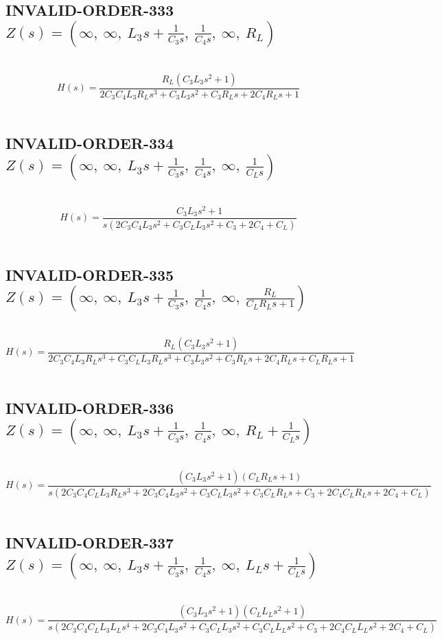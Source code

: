 \documentclass{article}
\begin{document}
\subsection{INVALID-ORDER-333 $Z(s) = \left( \infty, \  \infty, \  L_{3} s + \frac{1}{C_{3} s}, \  \frac{1}{C_{4} s}, \  \infty, \  R_{L}\right)$ } \ 
\textbf{\[H(s) = \frac{R_{L} \left(C_{3} L_{3} s^{2} + 1\right)}{2 C_{3} C_{4} L_{3} R_{L} s^{3} + C_{3} L_{3} s^{2} + C_{3} R_{L} s + 2 C_{4} R_{L} s + 1}\] } \ 
\subsection{INVALID-ORDER-334 $Z(s) = \left( \infty, \  \infty, \  L_{3} s + \frac{1}{C_{3} s}, \  \frac{1}{C_{4} s}, \  \infty, \  \frac{1}{C_{L} s}\right)$ } \ 
\textbf{\[H(s) = \frac{C_{3} L_{3} s^{2} + 1}{s \left(2 C_{3} C_{4} L_{3} s^{2} + C_{3} C_{L} L_{3} s^{2} + C_{3} + 2 C_{4} + C_{L}\right)}\] } \ 
\subsection{INVALID-ORDER-335 $Z(s) = \left( \infty, \  \infty, \  L_{3} s + \frac{1}{C_{3} s}, \  \frac{1}{C_{4} s}, \  \infty, \  \frac{R_{L}}{C_{L} R_{L} s + 1}\right)$ } \ 
\textbf{\[H(s) = \frac{R_{L} \left(C_{3} L_{3} s^{2} + 1\right)}{2 C_{3} C_{4} L_{3} R_{L} s^{3} + C_{3} C_{L} L_{3} R_{L} s^{3} + C_{3} L_{3} s^{2} + C_{3} R_{L} s + 2 C_{4} R_{L} s + C_{L} R_{L} s + 1}\] } \ 
\subsection{INVALID-ORDER-336 $Z(s) = \left( \infty, \  \infty, \  L_{3} s + \frac{1}{C_{3} s}, \  \frac{1}{C_{4} s}, \  \infty, \  R_{L} + \frac{1}{C_{L} s}\right)$ } \ 
\textbf{\[H(s) = \frac{\left(C_{3} L_{3} s^{2} + 1\right) \left(C_{L} R_{L} s + 1\right)}{s \left(2 C_{3} C_{4} C_{L} L_{3} R_{L} s^{3} + 2 C_{3} C_{4} L_{3} s^{2} + C_{3} C_{L} L_{3} s^{2} + C_{3} C_{L} R_{L} s + C_{3} + 2 C_{4} C_{L} R_{L} s + 2 C_{4} + C_{L}\right)}\] } \ 
\subsection{INVALID-ORDER-337 $Z(s) = \left( \infty, \  \infty, \  L_{3} s + \frac{1}{C_{3} s}, \  \frac{1}{C_{4} s}, \  \infty, \  L_{L} s + \frac{1}{C_{L} s}\right)$ } \ 
\textbf{\[H(s) = \frac{\left(C_{3} L_{3} s^{2} + 1\right) \left(C_{L} L_{L} s^{2} + 1\right)}{s \left(2 C_{3} C_{4} C_{L} L_{3} L_{L} s^{4} + 2 C_{3} C_{4} L_{3} s^{2} + C_{3} C_{L} L_{3} s^{2} + C_{3} C_{L} L_{L} s^{2} + C_{3} + 2 C_{4} C_{L} L_{L} s^{2} + 2 C_{4} + C_{L}\right)}\] } \ 
\end{document}
